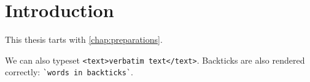 \chapter{Introduction}

This thesis tarts with \cref{chap:preparations}.

We can also typeset \verb|<text>verbatim text</text>|.
Backticks are also rendered correctly: \verb|`words in backticks`|.